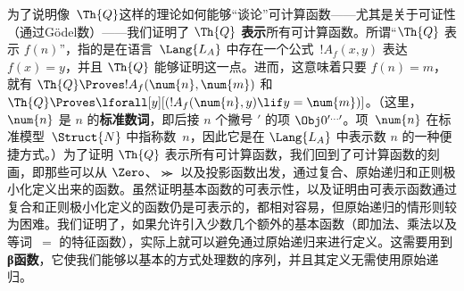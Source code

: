 为了说明像~$\Th{Q}$这样的理论如何能够“谈论”可计算函数——尤其是关于可证性（通过Gödel数）——我们证明了 $\Th{Q}$ \textbf{表示}所有可计算函数。所谓“$\Th{Q}$ 表示 $f(n)$”，指的是在语言~$\Lang{L_A}$ 中存在一个公式~$!A_f(x, y)$ 表达 $f(x) = y$，并且 $\Th{Q}$ 能够证明这一点。进而，这意味着只要 $f(n) = m$，就有 $\Th{Q} \Proves !A_f(\num{n},
\num{m})$ 和 $\Th{Q} \Proves \lforall[y][(!A_f(\num{n}, y) \lif y =
\num{m})]$。（这里，$\num{n}$ 是 $n$ 的\textbf{标准数词}，即后接 $n$ 个撇号 $\prime$ 的项 $\Obj 0^{\prime\dots\prime}$。项~$\num{n}$ 在标准模型~$\Struct{N}$ 中指称数~$n$，因此它是在 $\Lang{L_A}$ 中表示数 $n$ 的一种便捷方式。）为了证明 $\Th{Q}$ 表示所有可计算函数，我们回到了可计算函数的刻画，即那些可以从 $\Zero$、$\Succ$ 以及投影函数出发，通过复合、原始递归和正则极小化定义出来的函数。虽然证明基本函数的可表示性，以及证明由可表示函数通过复合和正则极小化定义的函数仍是可表示的，都相对容易，但原始递归的情形则较为困难。我们证明了，如果允许引入少数几个额外的基本函数（即加法、乘法以及等词~$=$ 的特征函数），实际上就可以避免通过原始递归来进行定义。这需要用到\textbf{β函数}，它使我们能够以基本的方式处理数的序列，并且其定义无需使用原始递归。